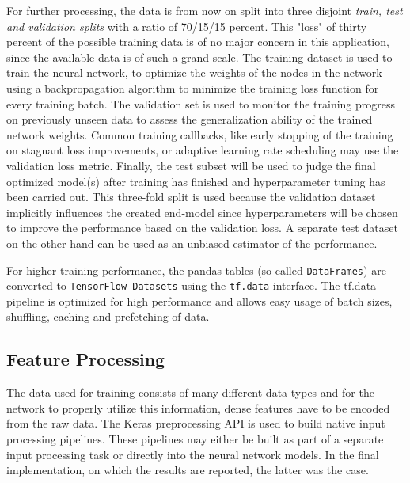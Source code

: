 \documentclass[10pt,final,journal,a4paper,oneside,twocolumn]{IEEEtran}
\begin{document}

For further processing, the data is from now on split into three disjoint \emph{train, test and validation splits} with a ratio of 70/15/15 percent.
This "loss" of thirty percent of the possible training data is of no major concern in this application, since the available data is of such a grand scale.
The training dataset is used to train the neural network, to optimize the weights of the nodes in the network using a backpropagation algorithm to minimize the training loss function for every training batch. The validation set is used to monitor the training progress on previously unseen data to assess the generalization ability of the trained network weights. Common training callbacks, like early stopping of the training on stagnant loss improvements, or adaptive learning rate scheduling may use the validation loss metric.
Finally, the test subset will be used to judge the final optimized model(s) after training has finished and hyperparameter tuning has been carried out. This three-fold split is used because the validation dataset implicitly influences the created end-model since hyperparameters will be chosen to improve the performance based on the validation loss. A separate test dataset on the other hand can be used as an unbiased estimator of the performance.

For higher training performance, the pandas tables (so called \texttt{DataFrames}) are converted to \texttt{TensorFlow Datasets} using the \texttt{tf.data} interface. The tf.data pipeline is optimized for high performance and allows easy usage of batch sizes, shuffling, caching and prefetching of data\footnotemark.

\subsection{Feature Processing}
The data used for training consists of many different data types and for the network to properly utilize this information, dense features have to be encoded from the raw data. The Keras preprocessing API is used to build native input processing pipelines\footnotemark. These pipelines may either be built as part of a separate input processing task or directly into the neural network models. In the final implementation, on which the results are reported, the latter was the case.
\end{document}
